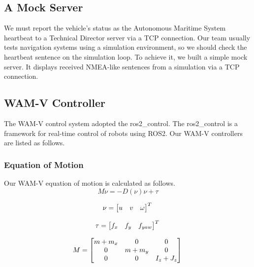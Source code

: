 \documentclass[lettersize,journal]{IEEEtran}
\begin{document}
\subsection{A Mock Server}
We must report the vehicle's status as the Autonomous Maritime System heartbeat to a Technical Director server via a TCP connection. 
Our team usually tests navigation systems using a simulation environment, 
so we should check the heartbeat sentence on the simulation loop. 
To achieve it, we built a simple mock server. 
It displays received NMEA-like sentences from a simulation via a TCP connection.

\subsection{WAM-V Controller}
The WAM-V control system adopted the ros2\_control\cite{ros2_control,wamv_control}.
The ros2\_control is a framework for real-time control of robots using ROS2.
Our WAM-V controllers are listed as follows.
\subsubsection{Equation of Motion}
Our WAM-V equation of motion is calculated as follows.
\begin{equation}
  M \dot\nu = -D(\nu)\nu + \tau
\end{equation}

\begin{equation}
  \nu = 
  \begin{bmatrix}
  u & v & \omega \\
  \end{bmatrix}^T\\
  \label{eq:control_1}
\end{equation}

\begin{equation}
\tau = 
\begin{bmatrix}
f_x & f_y & f_{yaw} \\
\end{bmatrix}^T\\
\end{equation}

\begin{equation}
M = 
\begin{bmatrix}
m+m_x &  0 & 0 \\
0 & m+m_y & 0 \\
0 & 0 & I_z + J_z
\end{bmatrix}\\
\end{equation}
\end{document}
